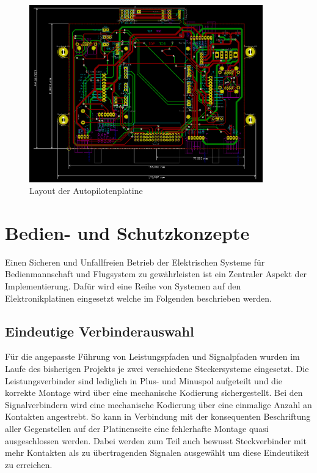 \begin{figure}[H]
\centering
\includegraphics[width=0.9\textwidth]{bilder/Centerbox/Centerbox-Rear-Pixhawk_AUVSI_2016_rev-01-layout.png} 
\caption{Layout der Autopilotenplatine} 
\label{fig:Layout der Autopilotenplatine}
\end{figure}

\newpage

\section{Bedien- und Schutzkonzepte}

Einen Sicheren und Unfallfreien Betrieb der Elektrischen Systeme für Bedienmannschaft und Flugsystem zu gewährleisten ist ein Zentraler Aspekt der Implementierung. Dafür wird eine Reihe von Systemen auf den Elektronikplatinen eingesetzt welche im Folgenden beschrieben werden.

\subsection{Eindeutige Verbinderauswahl}

Für die angepasste Führung von Leistungspfaden und Signalpfaden wurden im Laufe des bisherigen Projekts je zwei verschiedene Steckersysteme eingesetzt.
Die Leistungsverbinder sind lediglich in Plus- und Minuspol aufgeteilt und die korrekte Montage wird über eine mechanische Kodierung sichergestellt.
Bei den Signalverbindern wird eine mechanische Kodierung über eine einmalige Anzahl an Kontakten angestrebt. So kann in Verbindung mit der konsequenten Beschriftung aller Gegenstellen auf der Platinenseite eine fehlerhafte Montage quasi ausgeschlossen werden. Dabei werden zum Teil auch bewusst Steckverbinder mit mehr Kontakten als zu übertragenden Signalen ausgewählt um diese Eindeutikeit zu erreichen.

